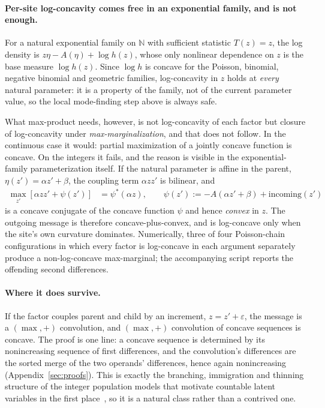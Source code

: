 \paragraph{Per-site log-concavity comes free in an exponential family, and is not enough.} For a natural exponential family on $\mathbb{N}$ with sufficient statistic $T(z) = z$, the log density is $z\eta - A(\eta) + \log h(z)$, whose only nonlinear dependence on $z$ is the base measure $\log h(z)$. Since $\log h$ is concave for the Poisson, binomial, negative binomial and geometric families, log-concavity in $z$ holds at \emph{every} natural parameter: it is a property of the family, not of the current parameter value, so the local mode-finding step above is always safe.

What max-product needs, however, is not log-concavity of each factor but closure of log-concavity under \emph{max-marginalization}, and that does not follow. In the continuous case it would: partial maximization of a jointly concave function is concave. On the integers it fails, and the reason is visible in the exponential-family parameterization itself. If the natural parameter is affine in the parent, $\eta(z') = \alpha z' + \beta$, the coupling term $\alpha z z'$ is bilinear, and
\begin{align}
    \max_{z'} \left[ \alpha z z' + \psi(z') \right] &= \psi^{*}(\alpha z), \qquad \psi(z') := -A(\alpha z' + \beta) + \text{incoming}(z')
\end{align}
is a concave conjugate of the concave function $\psi$ and hence \emph{convex} in $z$. The outgoing message is therefore concave-plus-convex, and is log-concave only when the site's own curvature dominates. Numerically, three of four Poisson-chain configurations in which every factor is log-concave in each argument separately produce a non-log-concave max-marginal; the accompanying script reports the offending second differences.

\paragraph{Where it does survive.} If the factor couples parent and child by an increment, $z = z' + \varepsilon$, the message is a $(\max,+)$ convolution, and $(\max,+)$ convolution of concave sequences is concave. The proof is one line: a concave sequence is determined by its nonincreasing sequence of first differences, and the convolution's differences are the sorted merge of the two operands' differences, hence again nonincreasing (Appendix~\ref{sec:proofs}). This is exactly the branching, immigration and thinning structure of the integer population models that motivate countable latent variables in the first place~\citep{Sheldon2018}, so it is a natural class rather than a contrived one.

